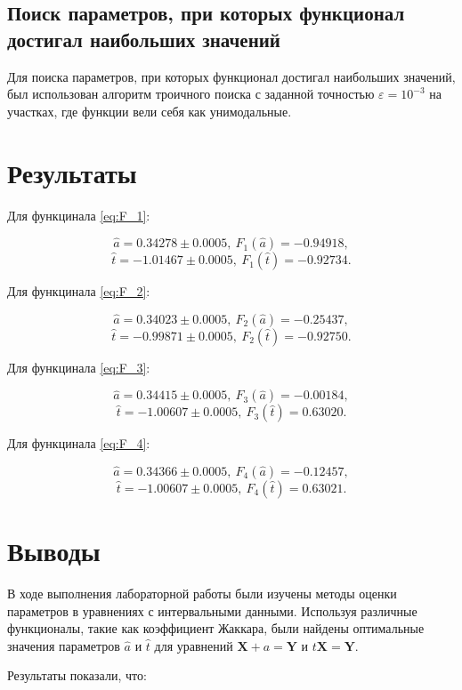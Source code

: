\documentclass{article}
\begin{document}
  \subsection{Поиск параметров, при которых функционал достигал наибольших
  значений}

  Для поиска параметров, при которых функционал достигал наибольших
  значений, был использован алгоритм троичного поиска с заданной точностью
  \( \varepsilon = 10^{-3} \) на участках, где функции вели
  себя как унимодальные.

  \section{Результаты}

  Для функцинала \ref{eq:F_1}:

  \[ \hat a = 0.34278 \pm 0.0005, \ F_1 (\hat a) = -0.94918, \]
  \[ \hat t = -1.01467 \pm 0.0005, \ F_1 (\hat t) = -0.92734. \]

  Для функцинала \ref{eq:F_2}:

  \[ \hat a = 0.34023 \pm 0.0005, \ F_2 (\hat a) = -0.25437, \]
  \[ \hat t = -0.99871 \pm 0.0005, \ F_2 (\hat t) = -0.92750. \]

  Для функцинала \ref{eq:F_3}:

  \[ \hat a = 0.34415 \pm 0.0005, \ F_3 (\hat a) = -0.00184, \]
  \[ \hat t = -1.00607 \pm 0.0005, \ F_3 (\hat t) = 0.63020. \]

  Для функцинала \ref{eq:F_4}:

  \[ \hat a = 0.34366 \pm 0.0005, \ F_4 (\hat a) = -0.12457, \]
  \[ \hat t = -1.00607 \pm 0.0005, \ F_4 (\hat t) = 0.63021. \]

  \section{Выводы}

  В ходе выполнения лабораторной работы были изучены методы оценки
  параметров в уравнениях с интервальными данными. Используя различные
  функционалы, такие как коэффициент Жаккара, были найдены оптимальные
  значения параметров \( \hat a \) и \( \hat t \) для уравнений
  \( \mathbf{X} + a = \mathbf{Y} \) и \( t\mathbf{X} = \mathbf{Y} \).

  Результаты показали, что:
\end{document}
